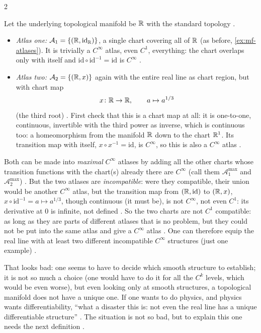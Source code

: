 \begin{paracol}{2}
\begin{example}\label{ex:df-line}
Let the underlying topological manifold be $\mathbb{R}$ with the standard topology .
\begin{itemize}
  \item \emph{Atlas one:} $\mathcal A_1=\{(\mathbb{R},\mathrm{id}_{\mathbb{R}})\}$, a single chart covering all of $\mathbb{R}$ (as before, \cref{ex:mf-atlases}). It is trivially a $C^\infty$ atlas, even $C^1$, everything: the chart overlaps only with itself and $\mathrm{id}\circ\mathrm{id}^{-1}=\mathrm{id}$ is $C^\infty$
        .
  \item \emph{Atlas two:} $\mathcal A_2=\{(\mathbb{R},x)\}$ again with the entire real line as chart region, but with chart map
        \[
          x\colon\mathbb{R}\to\mathbb{R},\qquad a\mapsto a^{1/3}
        \]
        (the third root) . First check that this is a chart map at all: it is one-to-one, continuous, invertible with the third power as inverse, which is continuous too: a homeomorphism from the manifold $\mathbb{R}$ down to the chart $\mathbb{R}^1$. Its transition map
        with itself, $x\circ x^{-1}=\mathrm{id}$, is $C^\infty$, so this is also a $C^\infty$ atlas .
\end{itemize}
Both can be made into \emph{maximal} $C^\infty$ atlases by adding all the other charts whose transition functions with the chart(s) already there are $C^\infty$ (call them $\mathcal A_1^{\max}$ and $\mathcal A_2^{\max}$) .
But the two atlases are \emph{incompatible}: were they compatible, their union would be another $C^\infty$ atlas, but the transition map from $(\mathbb{R},\mathrm{id})$ to $(\mathbb{R},x)$, $x\circ\mathrm{id}^{-1}=a\mapsto a^{1/3}$, though continuous (it must be), is not $C^\infty$, not even $C^1$: its derivative at $0$ is infinite, not defined
. So the two charts are not $C^1$ compatible: as long as they are parts of different atlases that is no problem, but they could not be put into the same atlas and give a $C^\infty$ atlas .
One can therefore equip the real line with at least two different incompatible $C^\infty$ structures (just one example) .
\end{example}
That looks bad: one seems to have to decide which smooth structure to establish; it is not so much a choice (one would have to do it for all the $C^k$ levels, which would be even worse), but even looking only at smooth structures, a topological manifold does not have a unique one. If one wants to do physics, and physics
wants differentiability, ``what a disaster this is: not even the real line has a unique differentiable structure'' . The situation is not so bad, but to explain this one needs the next definition .


\end{paracol}
